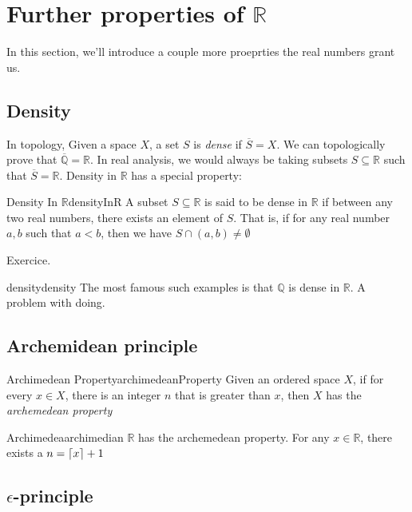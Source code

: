 \documentclass{book}
\newcommand{\Q}{{\mathbb{Q}}}
\newcommand{\R}{{\mathbb{R}}}
\newcommand{\sse}{\subseteq}
\newcommand{\oln}[1]{{\overline{#1}}}
\DeclarePairedDelimiter{\ceil}{\lceil}{\rceil}
\newenvironment{Proof}[1][]
  {\begin{ProofTcb}[#1]}
  {\end{ProofTcb}}
\begin{document}
\section[Further properties of real numbers]{Further properties of $\R$}

In this section, we'll introduce a couple more proeprties the real numbers grant us.
\subsection*{Density}

In topology, Given a space $X$, a set $S$ is \emph{dense} if $\oln{S} = X$. We can topologically prove that $\oln{\Q}
= \R$. In real analysis, we would always be taking subsets $S \sse \R$ such that $\oln{S} = \R$. Density in $\R$ has
a special property:
\begin{prop}{Density In $\R$}{densityInR}
	A subset $S \sse \R$ is said to be dense in $\R$ if between any two real numbers, there exists an element of $S$.
	That is, if for any real number $a,b$ such that $a < b$, then we have $S \cap(a,b) \ne \emptyset$
\end{prop}

\begin{Proof}
	Exercice.
\end{Proof}

\begin{example}{density}{density}
	The most famous such examples is that $\Q$ is dense in $\R$. A problem with doing.
\end{example}



\subsection*{Archemidean principle}


\begin{defn}{Archimedean Property}{archimedeanProperty}
	Given an ordered space $X$, if for every $x \in X$, there is an integer $n$ that is greater than $x$, then $X$ has
	the \emph{archemedean property}
\end{defn}

\begin{example}{Archimedea}{archimedian}
	$\R$ has the archemedean property. For any $x \in \R$, there exists a $n = \ceil{x}+1$
\end{example}


\subsection*{$\epsilon$-principle}
\end{document}
